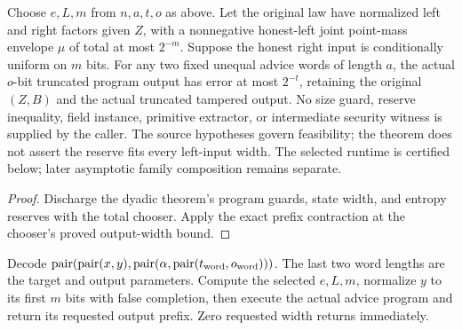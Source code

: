 \begin{corollary}
  \label{cor:lowerbounds-algebraic-advice-selected-extraction}
  \leanok
  Choose $e,L,m$ from $n,a,t,o$ as above. Let the original law have
  normalized left and right factors given $Z$, with a nonnegative
  honest-left joint point-mass envelope $\mu$ of total at most $2^{-m}$.
  Suppose the honest right input is conditionally uniform on $m$ bits.
  For any two fixed unequal advice words of length $a$, the actual
  $o$-bit truncated program output has error at most $2^{-t}$, retaining
  the original $(Z,B)$ and the actual truncated tampered output.
  No size guard, reserve inequality, field instance, primitive extractor,
  or intermediate security witness is supplied by the caller.
  The source hypotheses govern feasibility; the theorem does not assert
  the reserve fits every left-input width. The selected runtime is
  certified below; later asymptotic family composition remains separate.
\end{corollary}
\begin{proof}
  \leanok
  Discharge the dyadic theorem's program guards, state width, and entropy
  reserves with the total chooser. Apply the exact prefix contraction at
  the chooser's proved output-width bound.
\end{proof}

\begin{definition}
  \label{def:lowerbounds-algebraic-advice-selected-runtime}
  \leanok
  Decode
  $\operatorname{pair}(\operatorname{pair}(x,y),
    \operatorname{pair}(\alpha,\operatorname{pair}(t_{\rm word},o_{\rm word})))$.
  The last two word lengths are the target and output parameters.
  Compute the selected $e,L,m$, normalize $y$ to its first $m$ bits
  with false completion, then execute the actual advice program and
  return its requested output prefix. Zero requested width returns immediately.
\end{definition}

